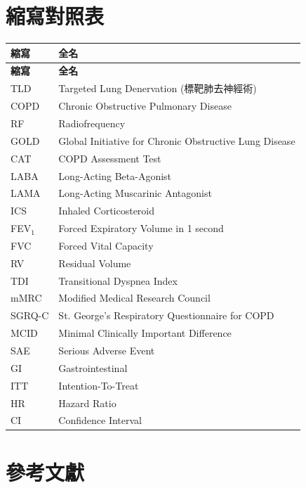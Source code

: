\documentclass[12pt,a4paper]{article}
\begin{document}
\section{縮寫對照表}

\begin{longtable}{p{3cm}p{11cm}}
\toprule
\textbf{縮寫} & \textbf{全名} \\
\midrule
\endfirsthead

\toprule
\textbf{縮寫} & \textbf{全名} \\
\midrule
\endhead

\bottomrule
\endfoot

TLD & Targeted Lung Denervation (標靶肺去神經術) \\
COPD & Chronic Obstructive Pulmonary Disease \\
RF & Radiofrequency \\
GOLD & Global Initiative for Chronic Obstructive Lung Disease \\
CAT & COPD Assessment Test \\
LABA & Long-Acting Beta-Agonist \\
LAMA & Long-Acting Muscarinic Antagonist \\
ICS & Inhaled Corticosteroid \\
FEV$_1$ & Forced Expiratory Volume in 1 second \\
FVC & Forced Vital Capacity \\
RV & Residual Volume \\
TDI & Transitional Dyspnea Index \\
mMRC & Modified Medical Research Council \\
SGRQ-C & St. George's Respiratory Questionnaire for COPD \\
MCID & Minimal Clinically Important Difference \\
SAE & Serious Adverse Event \\
GI & Gastrointestinal \\
ITT & Intention-To-Treat \\
HR & Hazard Ratio \\
CI & Confidence Interval \\
\bottomrule
\end{longtable}

\section{參考文獻}
\end{document}
